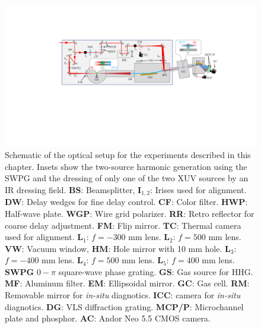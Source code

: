 \begin{figure}
	\centering
	\includegraphics[width=1.0\textwidth]{figures/CATS/beamline_schematic_CATS.pdf}
	\caption[TABLe experimental setup for CATS experiments]{Schematic of the optical setup for the experiments described in this chapter.  Insets show the two-source harmonic generation using the SWPG and the dressing of only one of the two XUV sources by an IR dressing field.  \textbf{BS}: Beamsplitter, \textbf{I$_{1,2}$}: Irises used for alignment. \textbf{DW}: Delay wedges for fine delay control. \textbf{CF}: Color filter. \textbf{HWP}: Half-wave plate. \textbf{WGP}: Wire grid polarizer. \textbf{RR}: Retro reflector for coarse delay adjustment.  \textbf{FM}: Flip mirror. \textbf{TC}: Thermal camera used for alignment.  \textbf{L$_1$}: $f=-300$ mm lens. \textbf{L$_2$}: $f=500$ mm lens. \textbf{VW}: Vacuum window, \textbf{HM}: Hole mirror with 10 mm hole.  \textbf{L$_3$}: $f=-400$ mm lens.  \textbf{L$_4$}: $f=500$ mm lens. \textbf{L$_5$}: $f=400$ mm lens. \textbf{SWPG} $0-\pi$ square-wave phase grating. \textbf{GS}: Gas source for HHG. \textbf{MF}: Aluminum filter. \textbf{EM}: Ellipsoidal mirror. \textbf{GC}: Gas cell. \textbf{RM}: Removable mirror for \textit{in-situ} diagnotics.    \textbf{ICC}: camera for \textit{in-situ} diagnotics. \textbf{DG}: VLS diffraction grating. \textbf{MCP/P}: Microchannel plate and phosphor.  \textbf{AC}: Andor Neo 5.5 CMOS camera.}
	\label{fig:CATS_setup}
\end{figure}

